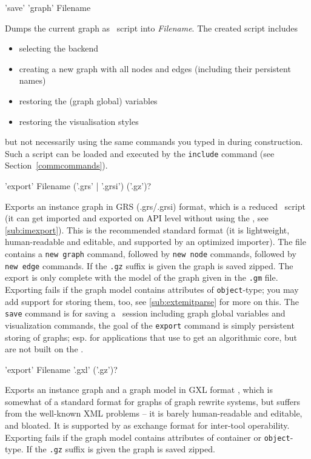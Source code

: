 \begin{rail}
  'save' 'graph' Filename
\end{rail}
Dumps the current graph as \GrShell\ script into \emph{Filename}.
The created script includes
\begin{itemize}
  \item selecting the backend
  \item creating a new graph with all nodes and edges (including their persistent names)
  \item restoring the (graph global) variables
  \item restoring the visualisation styles
\end{itemize}
but not necessarily using the same commands you typed in during construction.
Such a script can be loaded and executed by the \texttt{include} command (see Section~\ref{commcommands}).

\begin{rail}
  'export' Filename ('.grs' | '.grsi') ('.gz')?
\end{rail}
Exports an instance graph in GRS (.grs/.grsi) format, which is a reduced \GrShell\ script
(it can get imported and exported on API level without using the \GrShell, see \ref{sub:imexport}).
This is the recommended standard format (it is lightweight, human-readable and editable, and supported by an optimized importer).
The file contains a \texttt{new graph} command, followed by \texttt{new node} commands, followed by \texttt{new edge} commands.
If the \texttt{.gz} suffix is given the graph is saved zipped.
The export is only complete with the model of the graph given in the \texttt{.gm} file.
Exporting fails if the graph model contains attributes of \texttt{object}-type; you may add support for storing them, too, see \ref{sub:extemitparse} for more on this.
The \texttt{save} command is for saving a \GrShell\ session including graph global variables and visualization commands,
the goal of the \texttt{export} command is simply persistent storing of graphs;
esp. for applications that use \GrG{ }to get an algorithmic core, but are not built on the \GrShell.

\begin{rail}
  'export' Filename '.gxl' ('.gz')?
\end{rail}
Exports an instance graph and a graph model in GXL format \cite{GXL,GXL2},
which is somewhat of a standard format for graphs of graph rewrite systems,
but suffers from the well-known XML problems -- it is barely human-readable and editable, and bloated.
It is supported by \GrG{} as exchange format for inter-tool operability.
Exporting fails if the graph model contains attributes of container or \texttt{object}-type.
If the \texttt{.gz} suffix is given the graph is saved zipped.

